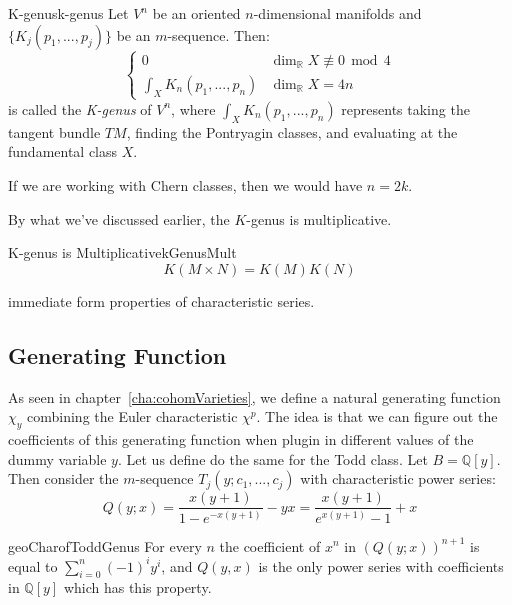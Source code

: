 \documentclass{book}
\newcommand{\Q}{{\mathbb{Q}}}
\newcommand{\R}{{\mathbb{R}}}
\newcommand{\qn}{\quad\newline}
\renewcommand{\mod}{\,\operatorname{mod}\,}
\begin{document}
\begin{defn}{K-genus}{k-genus}
  Let $V^n$ be an oriented $n$-dimensional manifolds and $\{K_j(p_1, ..., p_j)\}$ be an $m$-sequence. Then:
  \[
    \begin{cases}
      0 & \dim_\R X \not\equiv 0 \mod 4\\
      \int_X K_n(p_1, ..., p_n) & \dim_\R X = 4n
    \end{cases}
  \]
  is called the \emph{K-genus} of $V^{n}$, where $\int_X K_n(p_1, ..., p_n)$ represents taking the tangent bundle
  $TM$, finding the Pontryagin classes, and evaluating at the fundamental class $X$.

  \qn
  If we are working with Chern classes, then we would have $n=2k$.
\end{defn}

By what we've discussed earlier, the $K$-genus is multiplicative.
\begin{prop}{K-genus is Multiplicative}{kGenusMult}
  \[
    K(M\times N) = K(M)K(N)
  \]
\end{prop}

\begin{Proof}
  immediate form properties of characteristic series.
\end{Proof}


\subsection{Generating Function}

As seen in chapter~\ref{cha:cohomVarieties}, we define a natural generating function $\chi_y$ combining the
Euler characteristic $\chi^p$. The idea is that we can figure out the coefficients of this generating
function when plugin in different values of the dummy variable $y$. Let us define do the same for the Todd
class. Let $B = \Q[y]$. Then consider the $m$-sequence $T_j(y; c_1, ..., c_j)$ with characteristic power
series:
\[
  Q(y; x) = \frac{x(y+1)}{1-e^{-x(y+1)}} -yx = \frac{x(y+1)}{e^{x(y+1)}-1}+x
\]
\begin{lem}{}{geoCharofToddGenus}
  For every $n$ the coefficient of $x^n$ in $(Q(y;x))^{n+1}$ is equal to $\sum_{i=0}^n(-1)^iy^i$, and $Q(y,x)$
is the only power series with coefficients in $\mathbb{Q}[y]$ which has this property.
\end{lem}
\end{document}

